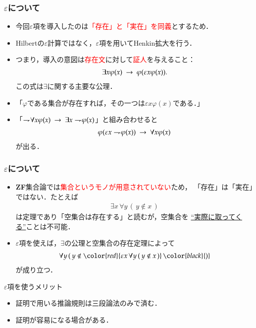 \documentclass[dvipdfmx,10pt,notheorems]{beamer}
\theoremstyle{definition}
\newcommand{\negation}{\rightharpoondown\hspace{-0.25em}} %
\newcommand{\rarrow}{\hspace{0.25em}\rightarrow\hspace{0.25em}} %
\begin{document}
\begin{frame}\frametitle{$\varepsilon$について}
	\begin{itemize}
		\item 今回$\varepsilon$項を導入したのは\textcolor{red}{「存在」と「実在」を同義}とするため．
		
		\item Hilbertの$\varepsilon$計算ではなく，$\varepsilon$項を用いてHenkin拡大を行う． 
			
		\item つまり，導入の意図は\textcolor{red}{存在文}に対して\textcolor{red}{証人}を与えること：
			\begin{align}
				\exists x \varphi(x) \rarrow \varphi(\varepsilon x \varphi(x)).
			\end{align}
			この式は$\exists$に関する主要な公理．
			
		\item 「$\varphi$である集合が存在すれば，その一つは$\varepsilon x \varphi(x)$である．」
		
		\item 「$\negation \forall x \varphi(x) \rarrow \exists x \negation \varphi(x)$」と組み合わせると
			\begin{align}
				\varphi(\varepsilon x \negation \varphi(x)) \rarrow \forall x \varphi(x)
			\end{align}
			が出る．
	\end{itemize}
\end{frame}

\begin{frame}\frametitle{$\varepsilon$について}
	\begin{itemize}
	\setlength{\itemsep}{10pt}
		\item {\bf ZF}集合論では\textcolor{red}{集合というモノが用意されていない}ため，
			「存在」は「実在」ではない．たとえば
			\begin{align}
				\exists x\, \forall y\, (\, y \notin x\, )
			\end{align}
			は定理であり「空集合は存在する」と読むが，空集合を
			\underline{``実際に取ってくる''}ことは不可能．
			
		\item $\varepsilon$項を使えば，$\exists$の公理と空集合の存在定理によって
			\begin{align}
				\forall y\, (\, y \notin \color{red}{\varepsilon x\, \forall y\, (\, y \notin x\, )}\, \color{black}{)}
			\end{align}
			が成り立つ．
	\end{itemize}
	
	\begin{block}{$\varepsilon$項を使うメリット}
		\begin{itemize}
			\item 証明で用いる推論規則は三段論法のみで済む．
			\item 証明が容易になる場合がある．
		\end{itemize}
	\end{block}
\end{frame}
\end{document}

